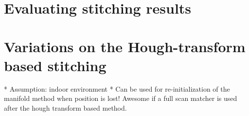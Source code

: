 \section{Evaluating stitching results}

\section{Variations on the Hough-transform based stitching}

* Assumption: indoor environment
* Can be used for re-initialization of the manifold method when position is lost! Awesome if a full scan matcher is used after the hough transform based method.